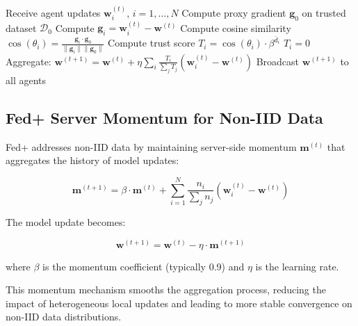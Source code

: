 \documentclass[conference]{IEEEtran}
\begin{document}
\begin{algorithm}[htbp]
\caption{FLTrust Aggregation at Server}
\begin{algorithmic}[1]
\State Receive agent updates $\mathbf{w}_i^{(t)}$, $i = 1, \ldots, N$
\State Compute proxy gradient $\mathbf{g}_0$ on trusted dataset $\mathcal{D}_0$
    \State Compute $\mathbf{g}_i = \mathbf{w}_i^{(t)} - \mathbf{w}^{(t)}$
    \State Compute cosine similarity $\cos(\theta_i) = \frac{\mathbf{g}_i \cdot \mathbf{g}_0}{\|\mathbf{g}_i\| \|\mathbf{g}_0\|}$
        \State Compute trust score $T_i = \cos(\theta_i) \cdot \beta^{\bar{d}_i}$
    \Else
        \State $T_i = 0$ 
    \EndIf
\EndFor
\State Aggregate: $\mathbf{w}^{(t+1)} = \mathbf{w}^{(t)} + \eta \sum_i \frac{T_i}{\sum_j T_j} (\mathbf{w}_i^{(t)} - \mathbf{w}^{(t)})$
\State Broadcast $\mathbf{w}^{(t+1)}$ to all agents
\end{algorithmic}
\end{algorithm}

\subsection{Fed+ Server Momentum for Non-IID Data}

Fed+ \cite{fedplus} addresses non-IID data by maintaining server-side momentum $\mathbf{m}^{(t)}$ that aggregates the history of model updates:

\begin{equation}
\mathbf{m}^{(t+1)} = \beta \cdot \mathbf{m}^{(t)} + \sum_{i=1}^{N} \frac{n_i}{\sum_j n_j} (\mathbf{w}_i^{(t)} - \mathbf{w}^{(t)})
\end{equation}

The model update becomes:

\begin{equation}
\mathbf{w}^{(t+1)} = \mathbf{w}^{(t)} - \eta \cdot \mathbf{m}^{(t+1)}
\end{equation}

where $\beta$ is the momentum coefficient (typically 0.9) and $\eta$ is the learning rate.

This momentum mechanism smooths the aggregation process, reducing the impact of heterogeneous local updates and leading to more stable convergence on non-IID data distributions.
\end{document}
